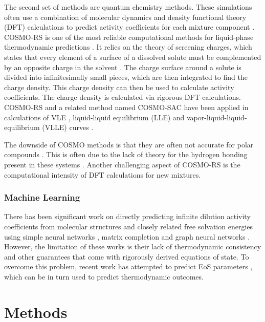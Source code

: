 The second set of methods are quantum chemistry methods. These simulations often use a combination of molecular dynamics and density functional theory (DFT) calculations to predict activity coefficients for each mixture component \cite{Constantinescu2005}. COSMO-RS is one of the most reliable computational methods for liquid-phase thermodynamic predictions \cite{Klamt1995, Klamt2010}. It relies on the theory of screening charges, which states that every element of a surface of a dissolved solute must be complemented by an opposite charge in the solvent  \cite{Klamt1995}. The charge surface around a solute is divided into infinitesimally small pieces, which are then integrated to find the charge density. This charge density can then be used to calculate activity coefficients. The charge density is calculated via rigorous DFT calculations. COSMO-RS and a related method named COSMO-SAC have been applied in calculations of VLE \cite{Constantinescu2005}, liquid-liquid equilibrium (LLE) \cite{Dechambre2014} and vapor-liquid-liquid-equilibrium (VLLE) curves \cite{Kundu2011}.

The downside of COSMO methods is that they are often not accurate for polar compounds \cite{Constantinescu2005, Kundu2011}. This is often due to the lack of theory for the hydrogen bonding present in these systems \cite{Kundu2011}. Another challenging aspect of COSMO-RS is the computational intensity of DFT calculations for new mixtures. 

\subsubsection{Machine Learning}

There has been significant work on directly predicting infinite dilution activity coefficients from molecular structures and closely related free solvation energies using simple neural networks \cite{Urata2002, RamirezBeltran2009, Nami2011, Behrooz2017}, matrix completion\cite{Jirasek2020} and  graph neural networks \cite{Vermeire2021, Felton2022, SanchezMedina2022, Qin2022, Rittig2022}. However, the limitation of these works is their lack of thermodynamic consistency and other guarantees that come with rigorously derived equations of state. To overcome this problem, recent work has attempted to predict EoS parameters \cite{Abbasi2020, Madani2021, Abdallahelhadj2022, Winter2022}, which can be in turn used to predict thermodynamic outcomes.
 
\section{Methods}
